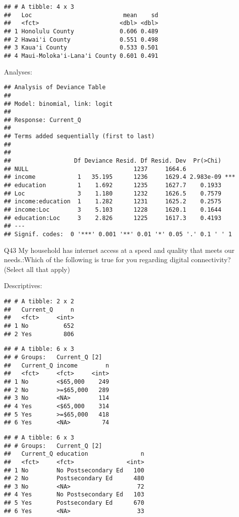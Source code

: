 \documentclass[]{article}
\begin{document}
\begin{verbatim}
## # A tibble: 4 x 3
##   Loc                          mean    sd
##   <fct>                       <dbl> <dbl>
## 1 Honolulu County             0.606 0.489
## 2 Hawai'i County              0.551 0.498
## 3 Kaua'i County               0.533 0.501
## 4 Maui-Moloka'i-Lana'i County 0.601 0.491
\end{verbatim}

Analyses:

\begin{verbatim}
## Analysis of Deviance Table
## 
## Model: binomial, link: logit
## 
## Response: Current_Q
## 
## Terms added sequentially (first to last)
## 
## 
##                  Df Deviance Resid. Df Resid. Dev  Pr(>Chi)    
## NULL                              1237     1664.6              
## income            1   35.195      1236     1629.4 2.983e-09 ***
## education         1    1.692      1235     1627.7    0.1933    
## Loc               3    1.180      1232     1626.5    0.7579    
## income:education  1    1.282      1231     1625.2    0.2575    
## income:Loc        3    5.103      1228     1620.1    0.1644    
## education:Loc     3    2.826      1225     1617.3    0.4193    
## ---
## Signif. codes:  0 '***' 0.001 '**' 0.01 '*' 0.05 '.' 0.1 ' ' 1
\end{verbatim}

Q43 My household has internet access at a speed and quality that meets
our needs.:Which of the following is true for you regarding digital
connectivity? (Select all that apply)

Descriptives:

\begin{verbatim}
## # A tibble: 2 x 2
##   Current_Q     n
##   <fct>     <int>
## 1 No          652
## 2 Yes         806
\end{verbatim}

\begin{verbatim}
## # A tibble: 6 x 3
## # Groups:   Current_Q [2]
##   Current_Q income        n
##   <fct>     <fct>     <int>
## 1 No        <$65,000    249
## 2 No        >=$65,000   289
## 3 No        <NA>        114
## 4 Yes       <$65,000    314
## 5 Yes       >=$65,000   418
## 6 Yes       <NA>         74
\end{verbatim}

\begin{verbatim}
## # A tibble: 6 x 3
## # Groups:   Current_Q [2]
##   Current_Q education               n
##   <fct>     <fct>               <int>
## 1 No        No Postsecondary Ed   100
## 2 No        Postsecondary Ed      480
## 3 No        <NA>                   72
## 4 Yes       No Postsecondary Ed   103
## 5 Yes       Postsecondary Ed      670
## 6 Yes       <NA>                   33
\end{verbatim}
\end{document}
